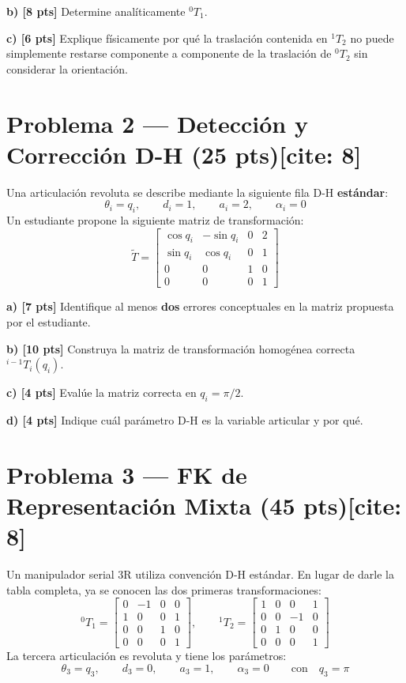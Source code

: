 \documentclass[11pt, a4paper]{article}
\begin{document}
\textbf{b) [8 pts]} Determine analíticamente ${}^{0}T_1$.

\textbf{c) [6 pts]} Explique físicamente por qué la traslación contenida en ${}^{1}T_2$ no puede simplemente restarse componente a componente de la traslación de ${}^{0}T_2$ sin considerar la orientación.

\section*{Problema 2 — Detección y Corrección D-H (25 pts)[cite: 8]}
Una articulación revoluta se describe mediante la siguiente fila D-H \textbf{estándar}:
\begin{equation*}
    \theta_i = q_i, \qquad d_i = 1, \qquad a_i = 2, \qquad \alpha_i = 0
\end{equation*}
Un estudiante propone la siguiente matriz de transformación:
\begin{equation*}
    \tilde{T} = \begin{bmatrix} \cos q_i & -\sin q_i & 0 & 2 \\ \sin q_i & \cos q_i & 0 & 1 \\ 0 & 0 & 1 & 0 \\ 0 & 0 & 0 & 1 \end{bmatrix}
\end{equation*}

\textbf{a) [7 pts]} Identifique al menos \textbf{dos} errores conceptuales en la matriz propuesta por el estudiante.

\textbf{b) [10 pts]} Construya la matriz de transformación homogénea correcta ${}^{i-1}T_i(q_i)$.

\textbf{c) [4 pts]} Evalúe la matriz correcta en $q_i = \pi/2$.

\textbf{d) [4 pts]} Indique cuál parámetro D-H es la variable articular y por qué.

\section*{Problema 3 — FK de Representación Mixta (45 pts)[cite: 8]}
Un manipulador serial 3R utiliza convención D-H estándar. En lugar de darle la tabla completa, ya se conocen las dos primeras transformaciones:
\begin{equation*}
    {}^{0}T_1 = \begin{bmatrix} 0 & -1 & 0 & 0 \\ 1 & 0 & 0 & 1 \\ 0 & 0 & 1 & 0 \\ 0 & 0 & 0 & 1 \end{bmatrix}, \qquad
    {}^{1}T_2 = \begin{bmatrix} 1 & 0 & 0 & 1 \\ 0 & 0 & -1 & 0 \\ 0 & 1 & 0 & 0 \\ 0 & 0 & 0 & 1 \end{bmatrix}
\end{equation*}
La tercera articulación es revoluta y tiene los parámetros:
\begin{equation*}
    \theta_3 = q_3, \qquad d_3 = 0, \qquad a_3 = 1, \qquad \alpha_3 = 0 \qquad \text{con} \quad q_3 = \pi
\end{equation*}
\end{document}
